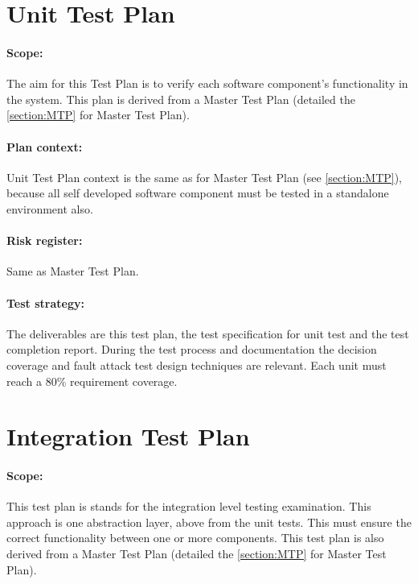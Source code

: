 \section{Unit Test Plan}
\paragraph{Scope:} The aim for this Test Plan is to verify each software component's functionality in the system. This plan is derived from a Master Test Plan (detailed the \autoref{section:MTP} for Master Test Plan). 
\paragraph{Plan context:} Unit Test Plan context is the same as for Master Test Plan (see \autoref{section:MTP}), because all self developed software component must be tested in a standalone environment also. 
\paragraph{Risk register:} Same as Master Test Plan.
\paragraph{Test strategy:} The deliverables are this test plan, the test specification for unit test and the test completion report. 
During the test process and documentation the decision coverage and fault attack test design techniques are relevant.
Each unit must reach a 80\%  requirement coverage. 


\section{Integration Test Plan}
\paragraph{Scope:} This test plan is stands for the integration level testing examination. This approach is one abstraction layer, above from the unit tests. This must ensure the correct functionality between one or more components. This test plan is also derived from a Master Test Plan (detailed the \autoref{section:MTP} for Master Test Plan).
